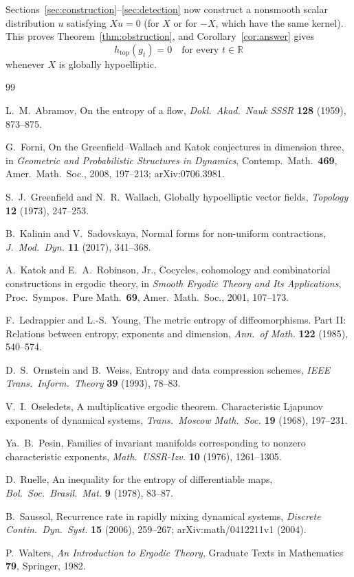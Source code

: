 \documentclass[11pt]{article}
\theoremstyle{remark}
\newcommand{\R}{\mathbb R}
\newcommand{\htop}{h_{\mathrm{top}}}
\begin{document}
Sections~\ref{sec:construction}--\ref{sec:detection} now construct a
nonsmooth scalar distribution \(u\) satisfying \(Xu=0\) (for \(X\) or
for \(-X\), which have the same kernel).
This proves Theorem~\ref{thm:obstruction}, and
Corollary~\ref{cor:answer} gives
\[
 \boxed{\htop(g_t)=0\quad\text{for every }t\in\R}
\]
whenever \(X\) is globally hypoelliptic.

\begin{thebibliography}{99}

L.~M.~Abramov,
On the entropy of a flow,
\emph{Dokl.\ Akad.\ Nauk SSSR} \textbf{128} (1959), 873--875.

G.~Forni,
On the Greenfield--Wallach and Katok conjectures in dimension three,
in \emph{Geometric and Probabilistic Structures in Dynamics},
Contemp.\ Math.\ \textbf{469}, Amer.\ Math.\ Soc., 2008, 197--213;
arXiv:0706.3981.

S.~J.~Greenfield and N.~R.~Wallach,
Globally hypoelliptic vector fields,
\emph{Topology} \textbf{12} (1973), 247--253.

B.~Kalinin and V.~Sadovskaya,
Normal forms for non-uniform contractions,
\emph{J.\ Mod.\ Dyn.} \textbf{11} (2017), 341--368.

A.~Katok and E.~A.~Robinson, Jr.,
Cocycles, cohomology and combinatorial constructions in ergodic
theory,
in \emph{Smooth Ergodic Theory and Its Applications},
Proc.\ Sympos.\ Pure Math.\ \textbf{69}, Amer.\ Math.\ Soc., 2001,
107--173.

F.~Ledrappier and L.-S.~Young,
The metric entropy of diffeomorphisms. Part II:
Relations between entropy, exponents and dimension,
\emph{Ann.\ of Math.} \textbf{122} (1985), 540--574.

D.~S.~Ornstein and B.~Weiss,
Entropy and data compression schemes,
\emph{IEEE Trans.\ Inform.\ Theory} \textbf{39} (1993), 78--83.

V.~I.~Oseledets,
A multiplicative ergodic theorem. Characteristic Ljapunov exponents
of dynamical systems,
\emph{Trans.\ Moscow Math.\ Soc.} \textbf{19} (1968), 197--231.

Ya.~B.~Pesin,
Families of invariant manifolds corresponding to nonzero
characteristic exponents,
\emph{Math.\ USSR-Izv.} \textbf{10} (1976), 1261--1305.

D.~Ruelle,
An inequality for the entropy of differentiable maps,
\emph{Bol.\ Soc.\ Brasil.\ Mat.} \textbf{9} (1978), 83--87.

B.~Saussol,
Recurrence rate in rapidly mixing dynamical systems,
\emph{Discrete Contin.\ Dyn.\ Syst.} \textbf{15} (2006), 259--267;
arXiv:math/0412211v1 (2004).

P.~Walters,
\emph{An Introduction to Ergodic Theory},
Graduate Texts in Mathematics \textbf{79}, Springer, 1982.

\end{thebibliography}
\end{document}
